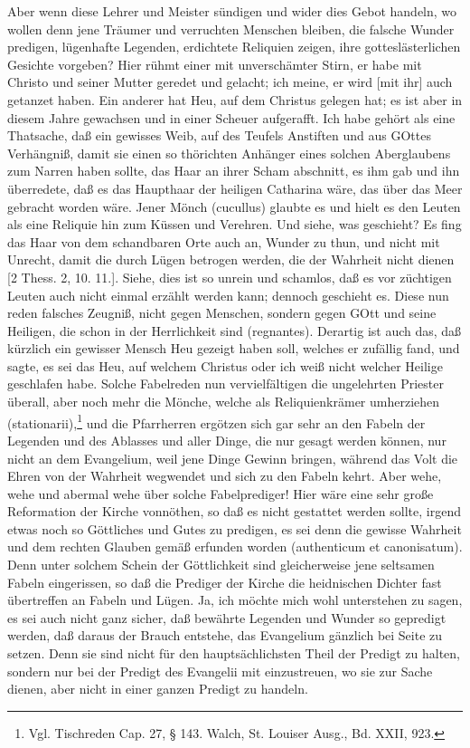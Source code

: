 Aber wenn diese Lehrer und Meister sündigen und wider dies Gebot handeln, wo wollen denn jene Träumer und verruchten Menschen bleiben, die falsche Wunder predigen, lügenhafte Legenden, erdichtete Reliquien zeigen, ihre gotteslästerlichen Gesichte vorgeben? Hier rühmt einer mit unverschämter Stirn, er habe mit Christo und seiner Mutter geredet und gelacht; ich meine, er wird [mit ihr] auch getanzet haben. Ein anderer hat Heu, auf dem Christus gelegen hat; es ist aber in diesem Jahre gewachsen und in einer Scheuer aufgerafft. Ich habe gehört als eine Thatsache, daß ein gewisses Weib, auf des Teufels Anstiften und aus GOttes Verhängniß, damit sie einen so thörichten Anhänger eines solchen Aberglaubens zum Narren haben sollte, das Haar an ihrer Scham abschnitt, es ihm gab und ihn überredete, daß es das Haupthaar der heiligen Catharina wäre, das über das Meer gebracht worden wäre. Jener Mönch (cucullus) glaubte es und hielt es den Leuten als eine Reliquie hin zum Küssen und Verehren. Und siehe, was geschieht? Es fing das Haar von dem schandbaren Orte auch an, Wunder zu thun, und nicht mit Unrecht, damit die durch
Lügen betrogen werden, die der Wahrheit nicht dienen [2 Thess. 2, 10. 11.]. Siehe, dies ist so unrein und schamlos, daß es vor züchtigen Leuten auch nicht einmal erzählt werden kann; dennoch geschieht es. Diese nun reden falsches Zeugniß, nicht gegen Menschen, sondern gegen GOtt und seine Heiligen, die schon in der Herrlichkeit sind (regnantes). Derartig ist auch das, daß kürzlich ein gewisser Mensch Heu gezeigt haben soll, welches er zufällig fand, und sagte, es sei das Heu, auf welchem Christus oder ich weiß nicht welcher Heilige geschlafen habe. Solche Fabelreden nun vervielfältigen die ungelehrten Priester überall, aber noch mehr die Mönche, welche als Reliquienkrämer umherziehen (stationarii),\footnote{Vgl. Tischreden Cap. 27, § 143. Walch, St. Louiser Ausg., Bd. XXII, 923.} und die Pfarrherren ergötzen sich gar sehr an den Fabeln der Legenden und des Ablasses und aller Dinge, die nur gesagt werden können, nur nicht an dem Evangelium, weil jene Dinge Gewinn bringen, während das Volt die Ehren von der Wahrheit wegwendet und sich zu den Fabeln kehrt. Aber wehe, wehe und abermal wehe über solche Fabelprediger! Hier wäre eine sehr große Reformation der Kirche vonnöthen, so daß es nicht gestattet werden sollte, irgend etwas noch so Göttliches und Gutes zu predigen, es sei denn die gewisse Wahrheit und dem rechten Glauben gemäß erfunden worden (authenticum et canonisatum). Denn unter solchem Schein der Göttlichkeit sind gleicherweise jene seltsamen Fabeln eingerissen, so daß die Prediger der Kirche die heidnischen Dichter fast übertreffen an Fabeln und Lügen. Ja, ich möchte mich wohl unterstehen zu sagen, es sei auch nicht ganz sicher, daß bewährte Legenden und Wunder so gepredigt werden, daß daraus der Brauch entstehe, das Evangelium gänzlich bei Seite zu setzen. Denn sie sind nicht für den hauptsächlichsten Theil der Predigt zu halten, sondern nur bei der Predigt des Evangelii mit einzustreuen, wo sie zur Sache dienen, aber nicht in einer ganzen Predigt zu handeln.

